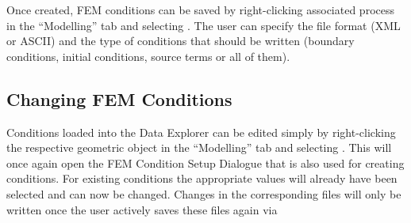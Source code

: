 Once created, FEM conditions can be saved by right-clicking associated process in the ``Modelling'' tab and selecting . The user can specify the file format (XML or ASCII) and the type of conditions that should be written (boundary conditions, initial conditions, source terms or all of them).

\subsection{Changing FEM Conditions}

Conditions loaded into the \ogs Data Explorer can be edited simply by right-clicking the respective geometric object in the ``Modelling'' tab and selecting . This will once again open the FEM Condition Setup Dialogue that is also used for creating conditions. For existing conditions the appropriate values will already have been selected and can now be changed. Changes in the corresponding files will only be written once the user actively saves these files again via 

